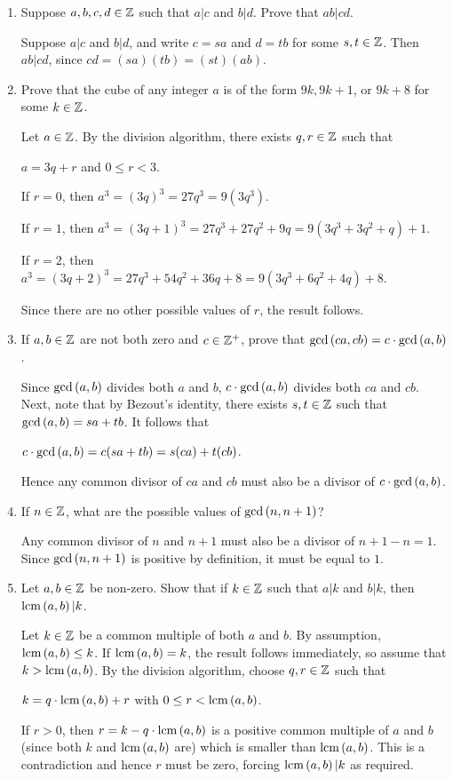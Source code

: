 \documentclass[11pt,fleqn,dvipsnames,usenames]{article}
\newcommand{\p}{\noindent}
\begin{document}
\begin{enumerate}
\item Suppose $a,b,c,d\in\mathbb{Z}$ such that $a|c$ and $b|d$.  Prove that $ab|cd$.
\vsmsp

\solution Suppose $a|c$ and $b|d$, and write $c = sa$ and $d = tb$ for some $s,t\in\mathbb{Z}$.  Then $ab|cd$, since $cd = (sa)(tb) = (st)(ab)$.

\item Prove that the cube of any integer $a$ is of the form $9k, 9k+1$, or $9k+8$ for some $k\in\mathbb{Z}$.
\vsmsp

\solution Let $a\in\mathbb{Z}$.  By the division algorithm, there exists $q,r\in\mathbb{Z}$ such that
\begin{center}
$a = 3q + r$ and $0\leq r < 3$.
\end{center}
\p If $r = 0$, then $a^3 = (3q)^3 = 27q^3 = 9(3q^3)$.
\vsmsp

\p If $r = 1$, then $a^3 = (3q + 1)^3 = 27q^3 + 27q^2 + 9q = 9(3q^3 + 3q^2 + q) + 1$.
\vsmsp

\p If $r = 2$, then $a^3 = (3q + 2)^3 = 27q^3 + 54q^2 + 36q + 8 = 9(3q^3 + 6q^2 + 4q) + 8$.
\vsmsp

\p Since there are no other possible values of $r$, the result follows.

\item If $a,b\in\mathbb{Z}$ are not both zero and $c\in\mathbb{Z}^{+}$, prove that $\text{gcd}\left(ca,cb\right) = c\cdot \text{gcd}\left(a,b\right)$.
\vsmsp

\solution Since $\text{gcd}\left(a,b\right)$ divides both $a$ and $b$, $c\cdot \text{gcd}\left(a,b\right)$ divides both $ca$ and $cb$.
Next, note that by Bezout's identity, there exists $s,t\in\mathbb{Z}$ such that $\text{gcd}\left(a,b\right) = sa + tb$.  It follows that
\begin{center}
$c\cdot \text{gcd}\left(a,b\right) = c(sa + tb) = s(ca) + t(cb)$.
\end{center}
Hence any common divisor of $ca$ and $cb$ must also be a divisor of $c\cdot\text{gcd}\left(a,b\right)$.

\item If $n\in \mathbb{Z}$, what are the possible values of $\text{gcd}\left(n, n+1\right)$?
\vsmsp

\solution Any common divisor of $n$ and $n+1$ must also be a divisor of $n+1 - n = 1$.  Since $\text{gcd}\left(n,n+1\right)$ is positive by definition, it must be equal to $1$.

\item Let $a,b\in\mathbb{Z}$ be non-zero.  Show that if $k\in\mathbb{Z}$ such that $a|k$ and $b|k$, then $\text{lcm}\left(a, b\right)|k$.
\vsmsp

\solution Let $k\in\mathbb{Z}$ be a common multiple of both $a$ and $b$.  By assumption, $\text{lcm}\left(a,b\right)\leq k$.  If $\text{lcm}\left(a,b\right) = k$, the result follows immediately, so assume that $k > \text{lcm}\left(a,b\right)$.  By the division algorithm, choose $q,r\in\mathbb{Z}$ such that
\begin{center}
$k = q\cdot \text{lcm}\left(a,b\right) + r$ with $0\leq r < \text{lcm}\left(a,b\right)$.
\end{center}
\p If $r > 0$, then $r = k - q\cdot \text{lcm}\left(a,b\right)$ is a positive common multiple of $a$ and $b$ (since both $k$ and $\text{lcm}\left(a,b\right)$ are) which is smaller than $\text{lcm}\left(a,b\right)$.  This is a contradiction and hence $r$ must be zero, forcing $\text{lcm}\left(a,b\right)|k$ as required.


\end{enumerate}
\end{document}
